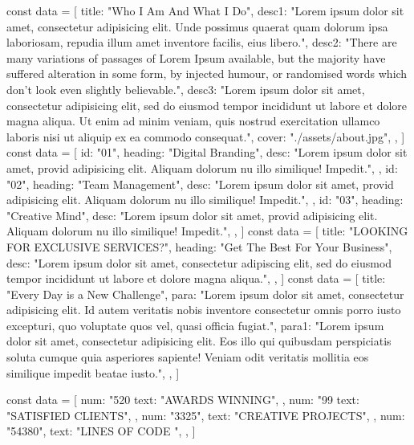 const data = [
    {
      title: "Who I Am And What I Do",
      desc1: "Lorem ipsum dolor sit amet, consectetur adipisicing elit. Unde possimus quaerat quam dolorum ipsa laboriosam, repudia illum amet inventore facilis, eius libero.",
      desc2: "There are many variations of passages of Lorem Ipsum available, but the majority have suffered alteration in some form, by injected humour, or randomised words which don't look even slightly believable.",
      desc3: "Lorem ipsum dolor sit amet, consectetur adipisicing elit, sed do eiusmod tempor incididunt ut labore et dolore magna aliqua. Ut enim ad minim veniam, quis nostrud exercitation ullamco laboris nisi ut aliquip ex ea commodo consequat.",
      cover: "./assets/about.jpg",
    },
  ]
   const data = [
    {
      id: "01",
      heading: "Digital Branding",
      desc: "Lorem ipsum dolor sit amet, provid adipisicing elit. Aliquam dolorum nu illo similique! Impedit.",
    },
    {
      id: "02",
      heading: "Team Management",
      desc: "Lorem ipsum dolor sit amet, provid adipisicing elit. Aliquam dolorum nu illo similique! Impedit.",
    },
    {
      id: "03",
      heading: "Creative Mind",
      desc: "Lorem ipsum dolor sit amet, provid adipisicing elit. Aliquam dolorum nu illo similique! Impedit.",
    },
  ]
    const data = [
    {
      title: "LOOKING FOR EXCLUSIVE SERVICES?",
      heading: "Get The Best For Your Business",
      desc: "Lorem ipsum dolor sit amet, consectetur adipiscing elit, sed do eiusmod tempor incididunt ut labore et dolore magna aliqua.",
    },
  ]
 const data = [
    {
      title: "Every Day is a New Challenge",
      para: "Lorem ipsum dolor sit amet, consectetur adipisicing elit. Id autem veritatis nobis inventore consectetur omnis porro iusto excepturi, quo voluptate quos vel, quasi officia fugiat.",
      para1: "Lorem ipsum dolor sit amet, consectetur adipisicing elit. Eos illo qui quibusdam perspiciatis soluta cumque quia asperiores sapiente! Veniam odit veritatis mollitia eos similique impedit beatae iusto.",
    },
  ]
  
  const data = [
    {
      num: "520%
      text: "AWARDS WINNING",
    },
    {
      num: "99%
      text: "SATISFIED CLIENTS",
    },
    {
      num: "3325",
      text: "CREATIVE PROJECTS",
    },
    {
      num: "54380",
      text: "LINES OF CODE ",
    },
  ]